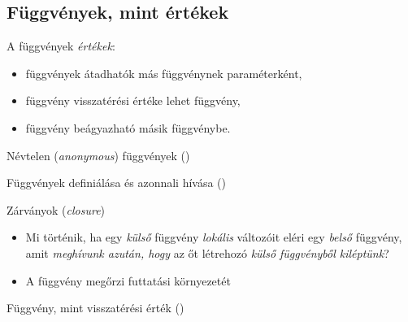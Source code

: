 \subsection{Függvények, mint értékek}

\begin{frame}
    A függvények \emph{értékek}:
    \begin{itemize}
        \item függvények átadhatók más függvénynek paraméterként,
        \item függvény visszatérési értéke lehet függvény,
        \item függvény beágyazható másik függvénybe.
    \end{itemize}
    \begin{exampleblock}{}
        
    \end{exampleblock}
\end{frame}

\begin{frame}
    \begin{exampleblock}{Névtelen (\emph{anonymous}) függvények ()}
        
    \end{exampleblock}
\end{frame}

\begin{frame}
    \begin{exampleblock}{Függvények definiálása és azonnali hívása ()}
        
    \end{exampleblock}
\end{frame}

\begin{frame}
    Zárványok (\emph{closure})
    \begin{itemize}
        \item<1-> Mi történik, ha egy \emph{külső} függvény \emph{lokális} változóit eléri egy \emph{belső} függvény, amit \emph{meghívunk azután, hogy} az őt létrehozó \emph{külső függvényből kiléptünk}?
        \item<2-> A függvény megőrzi futtatási környezetét
    \end{itemize}
\end{frame}

\begin{frame}
    \begin{exampleblock}{Függvény, mint visszatérési érték ()}
        \small
        
    \end{exampleblock}
\end{frame}

